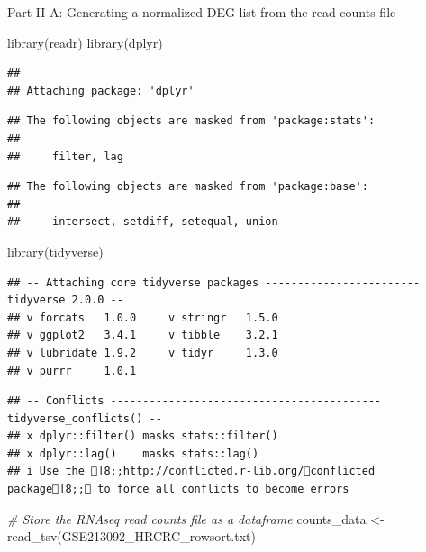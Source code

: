 \documentclass[
]{article}
\newenvironment{Shaded}{\begin{snugshade}}{\end{snugshade}}
\newcommand{\CommentTok}[1]{\textcolor[rgb]{0.56,0.35,0.01}{\textit{#1}}}
\newcommand{\FunctionTok}[1]{\textcolor[rgb]{0.00,0.00,0.00}{#1}}
\newcommand{\NormalTok}[1]{#1}
\newcommand{\OtherTok}[1]{\textcolor[rgb]{0.56,0.35,0.01}{#1}}
\newcommand{\StringTok}[1]{\textcolor[rgb]{0.31,0.60,0.02}{#1}}
\begin{document}
Part II A: Generating a normalized DEG list from the read counts file

\begin{Shaded}
\begin{Highlighting}[]
\FunctionTok{library}\NormalTok{(readr)}
\FunctionTok{library}\NormalTok{(dplyr)}
\end{Highlighting}
\end{Shaded}

\begin{verbatim}
## 
## Attaching package: 'dplyr'
\end{verbatim}

\begin{verbatim}
## The following objects are masked from 'package:stats':
## 
##     filter, lag
\end{verbatim}

\begin{verbatim}
## The following objects are masked from 'package:base':
## 
##     intersect, setdiff, setequal, union
\end{verbatim}

\begin{Shaded}
\begin{Highlighting}[]
\FunctionTok{library}\NormalTok{(tidyverse)}
\end{Highlighting}
\end{Shaded}

\begin{verbatim}
## -- Attaching core tidyverse packages ------------------------ tidyverse 2.0.0 --
## v forcats   1.0.0     v stringr   1.5.0
## v ggplot2   3.4.1     v tibble    3.2.1
## v lubridate 1.9.2     v tidyr     1.3.0
## v purrr     1.0.1
\end{verbatim}

\begin{verbatim}
## -- Conflicts ------------------------------------------ tidyverse_conflicts() --
## x dplyr::filter() masks stats::filter()
## x dplyr::lag()    masks stats::lag()
## i Use the ]8;;http://conflicted.r-lib.org/conflicted package]8;; to force all conflicts to become errors
\end{verbatim}

\begin{Shaded}
\begin{Highlighting}[]
\CommentTok{\# Store the RNAseq read counts file as a dataframe}
\NormalTok{counts\_data }\OtherTok{\textless{}{-}} \FunctionTok{read\_tsv}\NormalTok{(}\StringTok{\textquotesingle{}GSE213092\_HRCRC\_rowsort.txt\textquotesingle{}}\NormalTok{)}
\end{Highlighting}
\end{Shaded}
\end{document}
